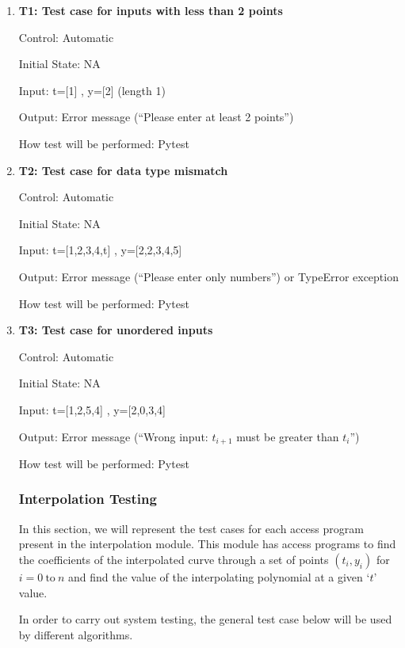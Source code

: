 \documentclass[12pt, titlepage]{article}
\begin{document}
\begin{enumerate}

\item{\textbf{T1: Test case for inputs with less than 2 points}\\}\label{{T1}}

Control: Automatic

Initial State: NA

Input: t=[1] , y=[2] (length 1)

Output: Error message (``Please enter at least  2 
points'')

How test will be performed: Pytest

\item{\textbf{T2: Test case for data type mismatch}\\}

Control: Automatic

Initial State: NA

Input: t=[1,2,3,4,t] , y=[2,2,3,4,5] 

Output: Error message (``Please enter only numbers'') or TypeError exception

How test will be performed: Pytest

\item{\textbf{T3: Test case for unordered inputs}\\}

Control: Automatic

Initial State: NA

Input: t=[1,2,5,4] , y=[2,0,3,4] 

Output: Error message (``Wrong input: $t_{i+1}$ must be greater than $t_i$'')

How test will be performed: Pytest



\subsubsection{Interpolation Testing}\label{InterpolationTesting}

In this section, we will represent the test cases for each access program 
present in the interpolation module. This module has access programs to find 
the coefficients of the interpolated curve through a set of points $(t_i,y_i)$ 
for $i = 0\ \text{to}\ n$ and find the value of the interpolating polynomial at 
a given `$t$' value.

In order to carry out system testing, the general test case below will be used 
by different algorithms.


\end{enumerate}
\end{document}
